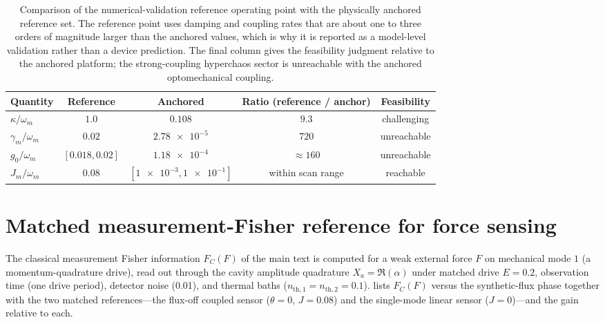 \documentclass[Phys]{SciPost}
\begin{document}
\begin{table}[h]
  \centering
  \caption{Comparison of the numerical-validation reference operating point with the
  physically anchored reference set. The reference point uses damping and coupling rates that are
  about one to three orders of magnitude larger than the anchored values, which is why
  it is reported as a model-level validation rather than a device prediction. The final
  column gives the feasibility judgment relative to the anchored platform; the
  strong-coupling hyperchaos sector is unreachable with the anchored optomechanical
  coupling.}
  \label{SI-tab:si-pilot-vs-anchor}
  \begin{tabular}{@{}lcccc@{}}
    \toprule
    Quantity & Reference & Anchored & Ratio (reference / anchor) & Feasibility \\
    \midrule
    $\kappa/\omega_m$ & $\num{1.0}$ & $\num{0.108}$ & $\num{9.3}$ & challenging \\
    $\gamma_m/\omega_m$ & $\num{0.02}$ & $\num{2.78e-5}$ & $\num{720}$ & unreachable \\
    $g_0/\omega_m$ & $[\num{0.018},\num{0.02}]$ & $\num{1.18e-4}$ & $\approx\num{160}$ & unreachable \\
    $J_m/\omega_m$ & $\num{0.08}$ & $[\num{1e-3},\num{1e-1}]$ & within scan range & reachable \\
    \bottomrule
  \end{tabular}
\end{table}

\section{Matched measurement-Fisher reference for force sensing}
\label{SI-sec:matched-fisher}

The classical measurement Fisher information $F_C(F)$ of the main text is
computed for a weak external force $F$ on mechanical mode $1$ (a
momentum-quadrature drive), read out through the cavity amplitude quadrature
$X_a=\Re(\alpha)$ under matched drive $E=\num{0.2}$, observation time (one
drive period), detector noise (\num{0.01}), and thermal baths
($n_{\mathrm{th},1}=n_{\mathrm{th},2}=\num{0.1}$). 
lists $F_C(F)$ versus the synthetic-flux phase together with the two matched
references---the flux-off coupled sensor ($\theta=0$, $J=\num{0.08}$) and the
single-mode linear sensor ($J=0$)---and the gain relative to each.
\end{document}
